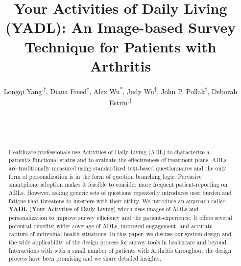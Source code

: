 \documentclass{sig-alternate-05-2015}
\begin{document}
\toappear{} 











\title{Your Activities of Daily Living (YADL):  An Image-based Survey Technique for Patients with Arthritis}




\vspace{-3mm}


\author{
Longqi Yang\textsuperscript{\textdagger,$\ddagger$}, Diana Freed\textsuperscript{$\ddagger$}, Alex Wu\textsuperscript{*}, Judy Wu\textsuperscript{$\ddagger$}, John P. Pollak\textsuperscript{$\ddagger$}, Deborah Estrin\textsuperscript{\textdagger,$\ddagger$}\\
 \\
\\
\\
}

\vspace{-3mm}



\maketitle


\begin{abstract}
Healthcare professionals use Activities of Daily Living (ADL) to characterize a patient's functional status and to evaluate the effectiveness of treatment plans. ADLs are traditionally measured using standardized text-based questionnaires and the only form of personalization is in the form of question branching logic. Pervasive smartphone adoption makes it feasible to consider more frequent patient-reporting on ADLs. However, asking generic sets of questions repeatedly introduces user burden and fatigue that threatens to interfere with their utility. We introduce an approach called \textbf{YADL} (\textbf{Y}our \textbf{A}ctivities of \textbf{D}aily \textbf{L}iving) which uses images of ADLs and personalization to improve survey efficiency and the patient-experience. It offers several potential benefits: wider coverage of ADLs, improved engagement, and accurate capture of individual health situations. In this paper, we discuss our system design and the wide applicability of the design process for survey tools in healthcare and beyond. Interactions with  with a small number of patients with Arthritis throughout the design process have been promising and we share  detailed insights.
\end{abstract}
\vspace{-3mm}
\end{document}

